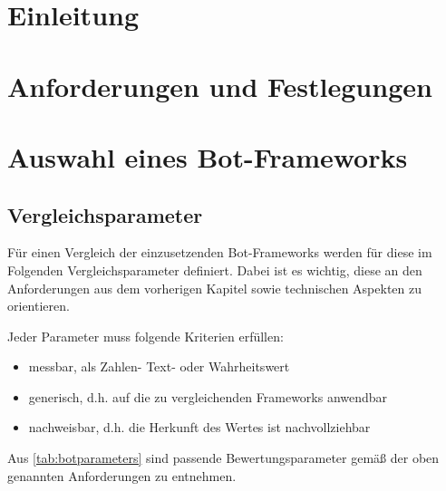 
\section{Einleitung}

\clearpage
\section{Anforderungen und Festlegungen}

\clearpage
\section{Auswahl eines Bot-Frameworks}
\subsection{Vergleichsparameter}
Für einen Vergleich der einzusetzenden Bot-Frameworks werden für diese im Folgenden Vergleichsparameter definiert. Dabei ist es wichtig, diese an den Anforderungen aus dem vorherigen Kapitel sowie technischen Aspekten zu orientieren.

Jeder Parameter muss folgende Kriterien erfüllen:

\begin{itemize}
    \item messbar, als Zahlen- Text- oder Wahrheitswert
    \item generisch, d.h. auf die zu vergleichenden Frameworks anwendbar
    \item nachweisbar, d.h. die Herkunft des Wertes ist nachvollziehbar
\end{itemize}

Aus \autoref{tab:botparameters} sind passende Bewertungsparameter gemäß der oben genannten Anforderungen zu entnehmen.

